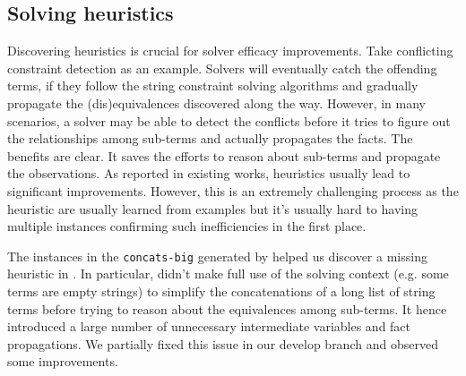 \subsection{Solving heuristics}
\vspace{-0.1in}

Discovering heuristics is crucial for solver efficacy improvements. Take 
conflicting constraint detection as an example. Solvers will eventually catch 
the offending terms, if they follow the string constraint solving algorithms and 
gradually propagate the (dis)equivalences discovered along the way. However, in 
many scenarios, a solver may be able to detect the conflicts before it tries to 
figure out the relationships among sub-terms and actually propagates the facts. 
The benefits are clear. It saves the efforts to reason about sub-terms and 
propagate the observations. As reported in existing works, heuristics usually 
lead to significant improvements. However, this is an extremely challenging 
process as the heuristic are usually learned from examples but it's usually hard 
to having multiple instances confirming such inefficiencies in the first place.

The instances in the \texttt{concats-big} generated by \fuzzer{} helped us 
discover a missing heuristic in \us{}. In particular, \us{} didn't make full use 
of the solving context (e.g. some terms are empty strings) to simplify the 
concatenations of a long list of string terms before trying to reason about the 
equivalences among sub-terms. It hence introduced a large number of unnecessary 
intermediate variables and fact propagations. We partially fixed this issue in 
our develop branch and observed some improvements.




        
        
        



